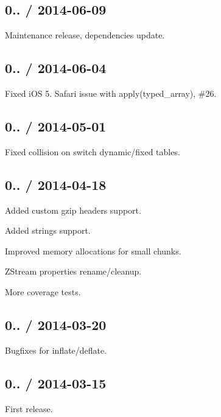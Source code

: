 \subsection*{0.. / 2014-\/06-\/09 }


\begin{DoxyItemize}
\item Maintenance release, dependencies update.
\end{DoxyItemize}

\subsection*{0.. / 2014-\/06-\/04 }


\begin{DoxyItemize}
\item Fixed i\+OS 5. Safari issue with {\ttfamily apply(typed\+\_\+array)}, \#26.
\end{DoxyItemize}

\subsection*{0.. / 2014-\/05-\/01 }


\begin{DoxyItemize}
\item Fixed collision on switch dynamic/fixed tables.
\end{DoxyItemize}

\subsection*{0.. / 2014-\/04-\/18 }


\begin{DoxyItemize}
\item Added custom gzip headers support.
\item Added strings support.
\item Improved memory allocations for small chunks.
\item Z\+Stream properties rename/cleanup.
\item More coverage tests.
\end{DoxyItemize}

\subsection*{0.. / 2014-\/03-\/20 }


\begin{DoxyItemize}
\item Bugfixes for inflate/deflate.
\end{DoxyItemize}

\subsection*{0.. / 2014-\/03-\/15 }


\begin{DoxyItemize}
\item First release. 
\end{DoxyItemize}